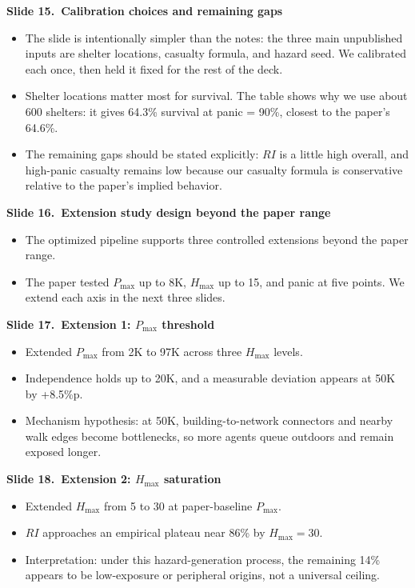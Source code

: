 \documentclass[11pt]{article}
\newcommand{\slide}[2]{\vspace{0.6em}\noindent\textbf{Slide #1.\ #2}\par\nopagebreak\vspace{0.1em}}
\begin{document}
\slide{15}{Calibration choices and remaining gaps}
\begin{itemize}
\item The slide is intentionally simpler than the notes: the three main unpublished inputs are shelter locations, casualty formula, and hazard seed. We calibrated each once, then held it fixed for the rest of the deck.
\item Shelter locations matter most for survival. The table shows why we use about 600 shelters: it gives 64.3\% survival at panic = 90\%, closest to the paper's 64.6\%.
\item The remaining gaps should be stated explicitly: $RI$ is a little high overall, and high-panic casualty remains low because our casualty formula is conservative relative to the paper's implied behavior.
\end{itemize}

\slide{16}{Extension study design beyond the paper range}
\begin{itemize}
\item The optimized pipeline supports three controlled extensions beyond the paper range.
\item The paper tested $P_{\max}$ up to 8K, $H_{\max}$ up to 15, and panic at five points. We extend each axis in the next three slides.
\end{itemize}

\slide{17}{Extension 1: $P_{\max}$ threshold}
\begin{itemize}
\item Extended $P_{\max}$ from 2K to 97K across three $H_{\max}$ levels.
\item Independence holds up to 20K, and a measurable deviation appears at 50K by +8.5\%p.
\item Mechanism hypothesis: at 50K, building-to-network connectors and nearby walk edges become bottlenecks, so more agents queue outdoors and remain exposed longer.
\end{itemize}

\slide{18}{Extension 2: $H_{\max}$ saturation}
\begin{itemize}
\item Extended $H_{\max}$ from 5 to 30 at paper-baseline $P_{\max}$.
\item $RI$ approaches an empirical plateau near 86\% by $H_{\max}=30$.
\item Interpretation: under this hazard-generation process, the remaining 14\% appears to be low-exposure or peripheral origins, not a universal ceiling.
\end{itemize}
\end{document}
